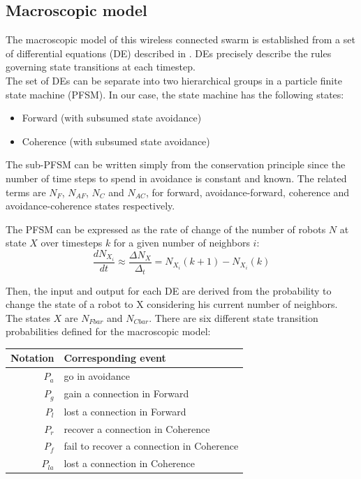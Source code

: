 \documentclass[a4paper, 10pt, conference]{ieeeconf}
\begin{document}
  \subsection{Macroscopic model}
  The macroscopic model of this wireless connected swarm is established from a set of differential equations (DE) described in \cite{Winfield08}. DEs precisely describe the rules governing state transitions at each timestep.\\

  The set of DEs can be separate into two hierarchical groups in a particle finite state machine (PFSM). In our case, the state machine has the following states:\\
  \begin{itemize}
    \item Forward (with subsumed state avoidance)
    \item Coherence (with subsumed state avoidance)
  \end{itemize}

  The sub-PFSM can be written simply from the conservation principle since the number of time steps to spend in avoidance is constant and known. The related terms are $N_F$, $N_{AF}$, $N_C$ and $N_{AC}$, for forward, avoidance-forward, coherence and avoidance-coherence states respectively.

  The PFSM can be expressed as the rate of change of the number of robots $N$ at state $X$ over timesteps $k$ for a given number of neighbors $i$:
  \[
    \frac{dN_{X_i}}{dt} \approx \frac{\Delta N_X}{\Delta_t} = N_{X_i}(k+1) - N_{X_i}(k)
  \]

  Then, the input and output for each DE are derived from the probability to change the state of a robot to X considering his current number of neighbors. The states $X$ are $N_{Fbar}$ and $N_{Cbar}$. There are six different state transition probabilities defined for the macroscopic model:

  \begin{table}[h]
    \begin{center}
      \begin{tabular}{r|l}
        \hline
        Notation   & Corresponding event \\
        \hline
        $P_a$      & go in avoidance \\
        $P_g$      & gain a connection in Forward \\
        $P_l$      & lost a connection in Forward \\
        $P_r$      & recover a connection in Coherence \\
        $P_f$      & fail to recover a connection in Coherence \\
        $P_{la}$   & lost a connection in Coherence \\
        \hline
      \end{tabular}
    \end{center}
  \end{table}
\end{document}
